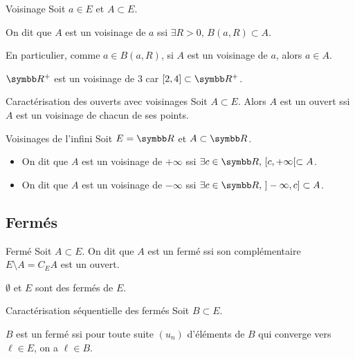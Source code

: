 \begin{definition}{Voisinage}{}
    Soit $a \in E$ et $A \subset E$.

    On dit que $A$ est un voisinage de $a$ ssi
    $\exists R > 0, \, B(a, R) \subset A$.
\end{definition}

\begin{remarque}
    En particulier, comme $a \in B(a, R)$, si $A$ est un voisinage de $a$, alors $a \in A$.
\end{remarque}

\begin{exemple}
    $\R^+$ est un voisinage de $3$ car $[2, 4] \subset \R^+$.
\end{exemple}

\begin{proposition}{Caractérisation des ouverts avec voisinages}{}
    Soit $A \subset E$. Alors $A$ est un ouvert ssi $A$ est un voisinage de chacun de ses points.
\end{proposition}

\begin{proposition}{Voisinages de l'infini}{}
    Soit $E = \R$ et $A \subset \R$.
    \begin{itemize}
        \item On dit que $A$ est un voisinage de $+\infty$
        ssi $\exists c \in \R, \, [c, +\infty[ \subset A$. 

        \item On dit que $A$ est un voisinage de $-\infty$ ssi 
        $\exists c \in \R, \, ]-\infty, c] \subset A$.
    \end{itemize}
\end{proposition}

\subsection{Fermés}

\begin{definition}{Fermé}{}
    Soit $A \subset E$.
    On dit que $A$ est un fermé ssi son complémentaire 
    $E \setminus A = C_E A$ est un ouvert.
\end{definition}

\begin{exemple}
    $\emptyset$ et $E$ sont des fermés de $E$. 
\end{exemple}

\begin{theoreme}{Caractérisation séquentielle des fermés}{}
    Soit $B \subset E$.
    
    $B$ est un fermé ssi pour toute suite $(u_n)$ d'éléments de $B$ qui converge 
    vers $\ell \in E$, on a $\ell \in B$.
\end{theoreme}

